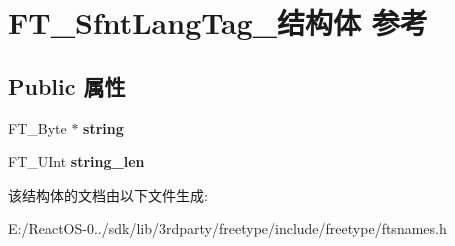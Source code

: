 \hypertarget{struct_f_t___sfnt_lang_tag__}{}\section{F\+T\+\_\+\+Sfnt\+Lang\+Tag\+\_\+结构体 参考}
\label{struct_f_t___sfnt_lang_tag__}
\subsection*{Public 属性}
\begin{DoxyCompactItemize}
\item 
\mbox{\label{struct_f_t___sfnt_lang_tag___a407651359548d5c45939bf2fda1692db}} 
F\+T\+\_\+\+Byte $\ast$ {\bfseries string}
\item 
\mbox{\label{struct_f_t___sfnt_lang_tag___ad4789510e3dd1f515259cb59abc1d44c}} 
F\+T\+\_\+\+U\+Int {\bfseries string\+\_\+len}
\end{DoxyCompactItemize}


该结构体的文档由以下文件生成\+:\begin{DoxyCompactItemize}
\item 
E\+:/\+React\+O\+S-\/0../sdk/lib/3rdparty/freetype/include/freetype/ftsnames.\+h\end{DoxyCompactItemize}
